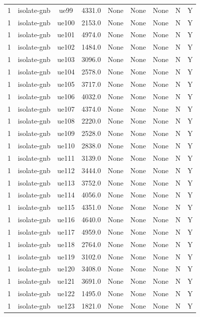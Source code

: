\begin{table}[ht]
\begin{tabular}{|c|c|c|c|c|c|c|c|c|}
1 & isolate-gnb & ue99 & 4331.0 & None & None & None & N & Y \\
1 & isolate-gnb & ue100 & 2153.0 & None & None & None & N & Y \\
1 & isolate-gnb & ue101 & 4974.0 & None & None & None & N & Y \\
1 & isolate-gnb & ue102 & 1484.0 & None & None & None & N & Y \\
1 & isolate-gnb & ue103 & 3096.0 & None & None & None & N & Y \\
1 & isolate-gnb & ue104 & 2578.0 & None & None & None & N & Y \\
1 & isolate-gnb & ue105 & 3717.0 & None & None & None & N & Y \\
1 & isolate-gnb & ue106 & 4032.0 & None & None & None & N & Y \\
1 & isolate-gnb & ue107 & 4374.0 & None & None & None & N & Y \\
1 & isolate-gnb & ue108 & 2220.0 & None & None & None & N & Y \\
1 & isolate-gnb & ue109 & 2528.0 & None & None & None & N & Y \\
1 & isolate-gnb & ue110 & 2838.0 & None & None & None & N & Y \\
1 & isolate-gnb & ue111 & 3139.0 & None & None & None & N & Y \\
1 & isolate-gnb & ue112 & 3444.0 & None & None & None & N & Y \\
1 & isolate-gnb & ue113 & 3752.0 & None & None & None & N & Y \\
1 & isolate-gnb & ue114 & 4056.0 & None & None & None & N & Y \\
1 & isolate-gnb & ue115 & 4351.0 & None & None & None & N & Y \\
1 & isolate-gnb & ue116 & 4640.0 & None & None & None & N & Y \\
1 & isolate-gnb & ue117 & 4959.0 & None & None & None & N & Y \\
1 & isolate-gnb & ue118 & 2764.0 & None & None & None & N & Y \\
1 & isolate-gnb & ue119 & 3102.0 & None & None & None & N & Y \\
1 & isolate-gnb & ue120 & 3408.0 & None & None & None & N & Y \\
1 & isolate-gnb & ue121 & 3691.0 & None & None & None & N & Y \\
1 & isolate-gnb & ue122 & 1495.0 & None & None & None & N & Y \\
1 & isolate-gnb & ue123 & 1821.0 & None & None & None & N & Y \\

\end{tabular}
\end{table}
